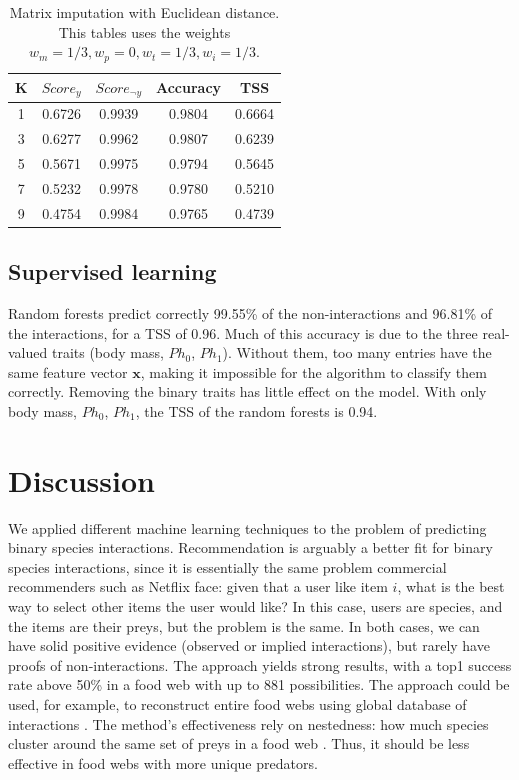 \documentclass[letterpaper]{article}
\begin{document}
\begin{table}
  \centering
  \begin{tabular}{|c|cccc|}
  \hline
  K                 & $Score_y$ & $Score_{\neg y}$ & Accuracy & TSS \\
  \hline
  \hline
  1                 & 0.6726    & 0.9939            & 0.9804   & 0.6664 \\
  3                 & 0.6277    & 0.9962            & 0.9807   & 0.6239 \\
  5                 & 0.5671    & 0.9975            & 0.9794   & 0.5645 \\
  7                 & 0.5232    & 0.9978            & 0.9780   & 0.5210 \\
  9                 & 0.4754    & 0.9984            & 0.9765   & 0.4739 \\
  \hline
  \end{tabular}

  \caption{Matrix imputation with Euclidean distance. This tables uses the
  weights $w_m = 1/3, w_p = 0, w_t = 1/3, w_i = 1/3$.}

  \label{table:knn_results}
\end{table}



\subsection{Supervised learning}

Random forests predict correctly 99.55\% of the non-interactions and
96.81\% of the interactions, for a TSS of 0.96. Much of this accuracy is due to
the three real-valued traits (body mass, $Ph_0$, $Ph_1$). Without them, too
many entries have the same feature vector $\mathbf{x}$, making it impossible
for the algorithm to classify them correctly. Removing the binary traits has
little effect on the model. With only body mass, $Ph_0$, $Ph_1$, the TSS of
the random forests is 0.94.



\section{Discussion}

We applied different machine learning techniques to the problem of predicting
binary species interactions. Recommendation is arguably a better fit for binary
species interactions, since it is essentially the same problem commercial
recommenders such as Netflix face: given that a user like item $i$, what is the
best way to select other items the user would like? In this case, users are
species, and the items are their preys, but the problem is the same. In both
cases, we can have solid positive evidence (observed or implied interactions),
but rarely have proofs of non-interactions. The approach yields strong results,
with a top1 success rate above 50\% in a food web with up to 881 possibilities.
The approach could be used, for example, to reconstruct entire food webs using
global database of interactions \cite{poe14}. The method's effectiveness rely
on nestedness: how much species cluster around the same set of preys in a food
web \cite{gui06}. Thus, it should be less effective in food webs with more
unique predators.
\end{document}
